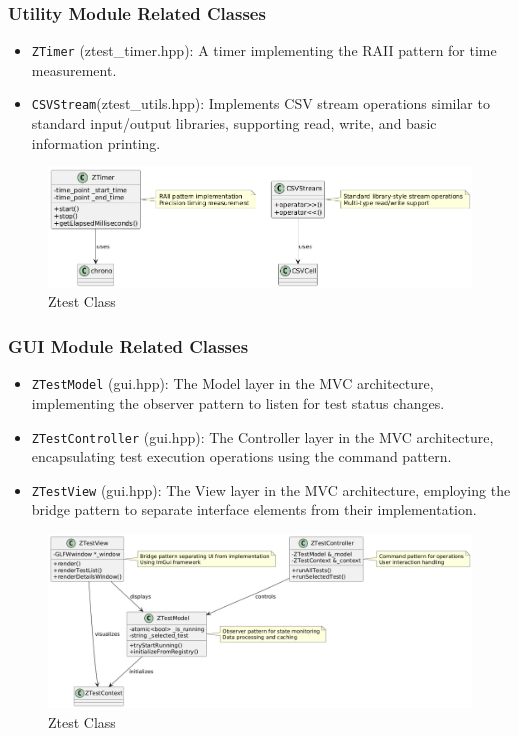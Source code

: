 \documentclass{article}
\begin{document}
\subsubsection{Utility Module Related Classes}
\begin{itemize}
    \item \texttt{ZTimer} (ztest\_timer.hpp): A timer implementing the RAII pattern for time measurement.
    \item \texttt{CSVStream}(ztest\_utils.hpp): Implements CSV stream operations similar to standard input/output libraries, supporting read, write, and basic information printing.
\end{itemize}
\begin{figure}[H]
    \centering
    \includegraphics[width = \textwidth]{img/c7.png} %
    \caption{ Ztest Class}
    \label{fig:ztest class }
\end{figure}
\subsubsection{GUI Module Related Classes}
\begin{itemize}
    \item \texttt{ZTestModel} (gui.hpp): The Model layer in the MVC architecture, implementing the observer pattern to listen for test status changes.
    \item \texttt{ZTestController} (gui.hpp): The Controller layer in the MVC architecture, encapsulating test execution operations using the command pattern.
    \item \texttt{ZTestView} (gui.hpp): The View layer in the MVC architecture, employing the bridge pattern to separate interface elements from their implementation.
\end{itemize}
\begin{figure}[H]
    \centering
    \includegraphics[width = \textwidth]{img/c8.png} %
    \caption{ Ztest Class}
    \label{fig:ztest class }
\end{figure}
\end{document}
